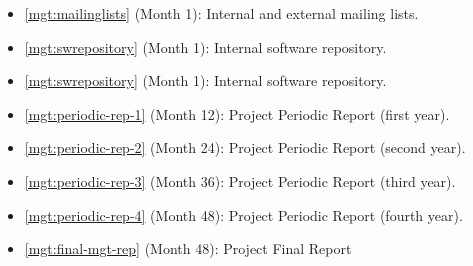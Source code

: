 \begin{Workpackage}{\thewpno}
\begin{WPDescription}
\end{WPDescription}

\begin{WPDeliverables}

\begin{itemize}
\item
\ref{mgt:mailinglists}
(Month 1): 
Internal and external mailing lists.
\item 
\ref{mgt:swrepository}
(Month 1): 
Internal software repository.
\item
\ref{mgt:swrepository}
(Month 1): 
Internal software repository.
\item
\ref{mgt:periodic-rep-1}
(Month 12): 
Project Periodic Report (first year).
\item
\ref{mgt:periodic-rep-2}
 (Month 24): 
Project Periodic Report (second year).
\item
\ref{mgt:periodic-rep-3}
(Month 36): 
Project Periodic Report (third year).
\item
\ref{mgt:periodic-rep-4}
(Month 48): 
Project Periodic Report (fourth year).
\item
\ref{mgt:final-mgt-rep}
(Month 48): 
Project Final Report
\end{itemize}
\end{WPDeliverables}
\end{Workpackage}

